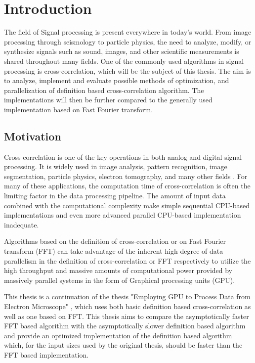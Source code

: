 \chapter*{Introduction}

The field of Signal processing is present everywhere in today's world. From image processing through seismology to particle physics, the need to analyze, modify, or synthesize signals such as sound, images, and other scientific measurements is shared throughout many fields. One of the commonly used algorithms in signal processing is cross-correlation, which will be the subject of this thesis. The aim is to analyze, implement and evaluate possible methods of optimization, and parallelization of definition based cross-correlation algorithm. The implementations will then be further compared to the generally used implementation based on Fast Fourier transform.

\section*{Motivation}

Cross-correlation is one of the key operations in both analog and digital signal processing.
It is widely used in image analysis, pattern recognition, image segmentation, particle physics, electron tomography, and many other fields \citep{Kapinchev2015}. For many of these applications, the computation time of cross-correlation is often the limiting factor in the data processing pipeline. The amount of input data combined with the computational complexity make simple sequential CPU-based implementations and even more advanced parallel CPU-based implementation inadequate.

Algorithms based on the definition of cross-correlation or on Fast Fourier transform (FFT) can take advantage of the inherent high degree of data parallelism in the definition of cross-correlation or FFT respectively to utilize the high throughput and massive amounts of computational power provided by massively parallel systems in the form of Graphical processing units (GPU).

This thesis is a continuation of the thesis "Employing GPU to Process Data from Electron Microscope" \citep{misko}, which uses both basic definition based cross-correlation as well as one based on FFT. This thesis aims to compare the asymptotically faster FFT based algorithm with the asymptotically slower definition based algorithm and provide an optimized implementation of the definition based algorithm which, for the input sizes used by the original thesis, should be faster than the FFT based implementation.

